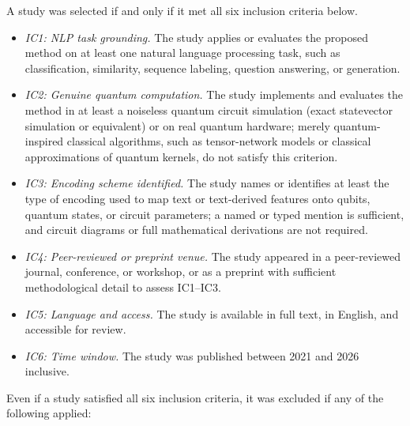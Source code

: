 \documentclass{ieeeaccess}
\begin{document}
A study was selected if and only if it met all six inclusion criteria below.
\begin{itemize}
\item \textit{IC1: NLP task grounding.} The study applies or evaluates the
  proposed method on at least one natural language processing task, such as
  classification, similarity, sequence labeling, question answering, or
  generation.
\item \textit{IC2: Genuine quantum computation.} The study implements and
  evaluates the method in at least a noiseless quantum circuit simulation
  (exact statevector simulation or equivalent) or on real quantum hardware;
  merely quantum-inspired classical algorithms, such as tensor-network models
  or classical approximations of quantum kernels, do not satisfy this
  criterion.
\item \textit{IC3: Encoding scheme identified.} The study names or identifies
  at least the type of encoding used to map text or text-derived features onto
  qubits, quantum states, or circuit parameters; a named or typed mention is
  sufficient, and circuit diagrams or full mathematical derivations are not
  required.
\item \textit{IC4: Peer-reviewed or preprint venue.} The study appeared in a
  peer-reviewed journal, conference, or workshop, or as a preprint with
  sufficient methodological detail to assess IC1--IC3.
\item \textit{IC5: Language and access.} The study is available in full text,
  in English, and accessible for review.
\item \textit{IC6: Time window.} The study was published between 2021 and 2026
  inclusive.
\end{itemize}
Even if a study satisfied all six inclusion criteria, it was excluded if any of
the following applied:
\end{document}
